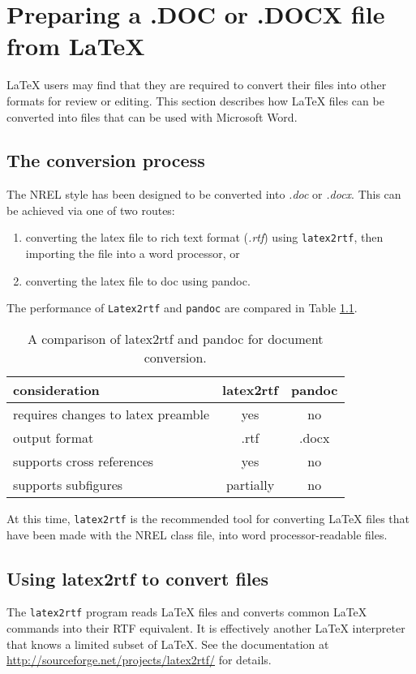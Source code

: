 \chapter{Preparing a .DOC or .DOCX file from LaTeX}\label{sec:latextodoc}
LaTeX users may find that they are required to convert their files into other formats for review or  editing. This section describes how LaTeX files can be converted into files that can be used with Microsoft Word.

\section{The conversion process} 
The NREL style has been designed to be converted into \emph{.doc} or \emph{.docx}. This can be achieved via one of two routes:
\begin{enumerate}
\item converting the latex file to rich text format (\emph{.rtf}) using \texttt{latex2rtf}, then importing the file into a word processor, or
\item converting the latex file to doc using pandoc.
\end{enumerate}

The performance of \texttt{Latex2rtf} and \texttt{pandoc} are compared in Table \ref{tab:conversioncomparison}.

\begin{table}[!h]
\centering
\caption{A comparison of latex2rtf and pandoc for document conversion.}\label{tab:conversioncomparison}
\begin{tabular}{lcc}
consideration & latex2rtf & pandoc \\\hline
requires changes to latex preamble & yes & no\\
output format & .rtf & .docx \\
supports cross references & yes & no\\
supports subfigures & partially & no\\
\end{tabular}
\end{table}

At this time, \texttt{latex2rtf} is the recommended tool for converting LaTeX files that have been made with the NREL class file, into word processor-readable files.

\section{Using latex2rtf to convert files}
The \texttt{latex2rtf} program reads LaTeX files and converts common LaTeX commands into their RTF equivalent. It is effectively another LaTeX interpreter that knows a limited subset of LaTeX. See the documentation at \href{http://sourceforge.net/projects/latex2rtf/}{http://sourceforge.net/projects/latex2rtf/} for details.


